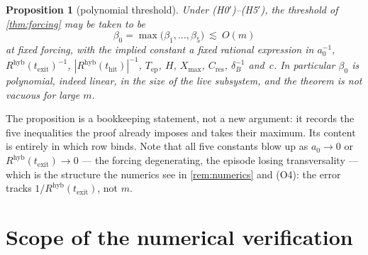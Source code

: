 \documentclass[11pt]{article}
\newtheorem{proposition}{Proposition}
\theoremstyle{definition}
\theoremstyle{remark}
\newcommand{\hyb}{\mathrm{hyb}}
\newcommand{\thit}{t_{\mathrm{hit}}}
\newcommand{\texit}{t_{\mathrm{exit}}}
\newcommand{\Tep}{T_{\mathrm{ep}}}
\begin{document}
\begin{proposition}[polynomial threshold]\label{prop:beta0}
Under \textup{(H0$'$)--(H5$'$)}, the threshold of \cref{thm:forcing} may be taken
to be
\[
\beta_0=\max\bigl(\beta_1,\ldots,\beta_5\bigr)
\ \lesssim\ O(m)
\]
at fixed forcing, with the implied constant a fixed rational expression in
$a_0^{-1}$, $R^{\hyb}(\texit)^{-1}$, $|R^{\hyb}(\thit)|^{-1}$, $\Tep$, $H$,
$X_{\max}$, $C_{\mathrm{res}}$, $\delta_B^{-1}$ and~$c$. In particular $\beta_0$
is \emph{polynomial}, indeed linear, in the size of the live subsystem, and the
theorem is not vacuous for large $m$.
\end{proposition}

\noindent The proposition is a bookkeeping statement, not a new argument: it
records the five inequalities the proof already imposes and takes their maximum.
Its content is entirely in which row binds. Note that all five constants blow up
as $a_0\to0$ or $R^{\hyb}(\texit)\to0$ --- the forcing degenerating, the episode
losing transversality --- which is the structure the numerics see in
\cref{rem:numerics} and (O4): the error tracks $1/R^{\hyb}(\texit)$, not $m$.

\section{Scope of the numerical verification}\label{sec:numerics-scope}
\end{document}
